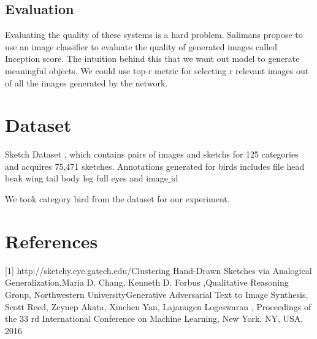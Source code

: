 \documentclass{article}
\begin{document}
\subsection{Evaluation}
Evaluating the quality of these systems is a hard problem. Salimans propose to use an image classifier to evaluate the quality of generated images called Inception score. The intuition behind this that we want out model to generate meaningful objects. 
We could use top-r metric for selecting r relevant images out of all the images generated by the network. 

\section{Dataset}
Sketch Dataset , which contains pairs of images and sketchs for 125 categories and acquires 75,471 sketches.\newline
Annotations generated for birds includes file head beak wing tail body leg full eyes and image$\_$id

We took category bird from the dataset for our experiment.\newline

\section{References}
[1] http://sketchy.eye.gatech.edu/\newline
[2] Clustering Hand-Drawn Sketches via Analogical Generalization,Maria D. Chang, Kenneth D. Forbus ,Qualitative Reasoning Group, Northwestern University\newline
[3] Generative Adversarial Text to Image Synthesis, Scott Reed, Zeynep Akata, Xinchen Yan, Lajanugen Logeswaran , Proceedings of the 33 rd International Conference on Machine
Learning, New York, NY, USA, 2016\newline
\end{document}
